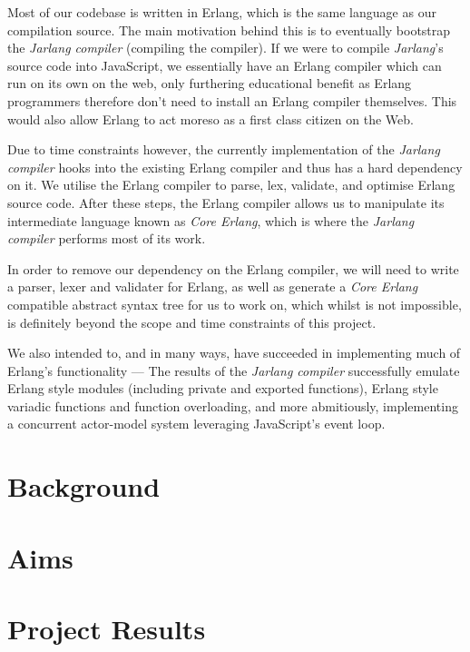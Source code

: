 \documentclass[twoside,12pt,titlepage,a4paper]{article}
\begin{document}
	Most of our codebase is written in Erlang, which is the same language as our compilation source. The main motivation behind this is to eventually bootstrap the \textit{Jarlang compiler} (compiling the compiler). If we were to compile \textit{Jarlang}'s source code into JavaScript, we essentially have an Erlang compiler which can run on its own on the web, only furthering educational benefit as Erlang programmers therefore don't need to install an Erlang compiler themselves. This would also allow Erlang to act moreso as a first class citizen on the Web.
	
	Due to time constraints however, the currently implementation of the \textit{Jarlang compiler} hooks into the existing Erlang compiler and thus has a hard dependency on it. We utilise the Erlang compiler to parse, lex, validate, and optimise Erlang source code. After these steps, the Erlang compiler allows us to manipulate its intermediate language known as \textit{Core Erlang}, which is where the \textit{Jarlang compiler} performs most of its work.
	
	In order to remove our dependency on the Erlang compiler, we will need to write a parser, lexer and validater for Erlang, as well as generate a \textit{Core Erlang} compatible abstract syntax tree for us to work on, which whilst is not impossible, is definitely beyond the scope and time constraints of this project.

	We also intended to, and in many ways, have succeeded in implementing much of Erlang's functionality --- The results of the \textit{Jarlang compiler} successfully emulate Erlang style modules (including private and exported functions), Erlang style variadic functions and function overloading, and more abmitiously, implementing a concurrent actor-model system leveraging JavaScript's event loop.
\section{Background}
\label{Background}


\section{Aims}
\label{Aims}


\section{Project Results}
\label{Results}
\end{document}
